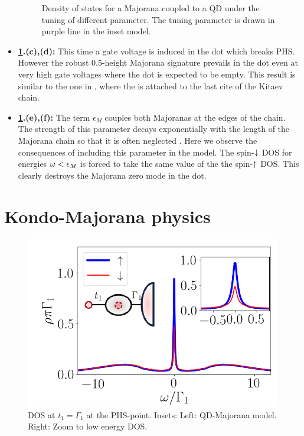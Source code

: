 \begin{itemize}
\begin{figure}[h]
     \caption{Density of states for a Majorana coupled to a QD under the tuning of different parameter. The tuning parameter is drawn in purple line in the inset model.  \label{fig:M1-Tot} \protect\Source{   }}
\end{figure}

  
    \item\textbf{ \ref{fig:M1-Tot}.(c),(d):} This time a gate voltage is induced in the dot which breaks PHS. However the robust $0.5$-height Majorana signature prevails in the dot even at very high gate voltages where the dot is expected to be empty. This result is similar to the one in \cite{vernek_subtle_2014}, where the is attached to the last cite of the Kitaev chain. 
    
    \item\textbf{ \ref{fig:M1-Tot}.(e),(f):} The term $\epsilon_M$ couples both Majoranas at the edges of the chain. The strength of this parameter decays exponentially with the length of the Majorana  chain so that it is often neglected . Here we observe the consequences of including this parameter in the model. The spin-$\downarrow$ DOS for energies $\omega < \epsilon_M$ is forced to take the same value of the the spin-$\uparrow$ DOS. This clearly destroys the Majorana zero mode in the dot.   
\end{itemize}







\section{Kondo-Majorana physics}
\begin{figure}[t]
\centering
\includegraphics[scale=0.6]{IMAGES/Majorana/NRG_M1.png}
\caption{ \label{fig:NRG-1M} DOS at $t_1 = \Gamma_1$ at the PHS-point.  Insets: Left: QD-Majorana model. Right: Zoom to low energy DOS. \protect{}}
\end{figure}

